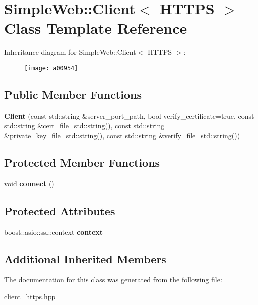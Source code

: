 \hypertarget{a00954}{}\section{Simple\+Web\+:\+:Client$<$ H\+T\+T\+PS $>$ Class Template Reference}
\label{a00954}
Inheritance diagram for Simple\+Web\+:\+:Client$<$ H\+T\+T\+PS $>$\+:\begin{figure}[H]
\begin{center}
\leavevmode
\texttt{[image: a00954]}
\end{center}
\end{figure}
\subsection*{Public Member Functions}
\begin{DoxyCompactItemize}
\item 
\mbox{\label{a00954_abd87d3dc08c9fed3a60f18c749b8bacd}} 
{\bfseries Client} (const std\+::string \&server\+\_\+port\+\_\+path, bool verify\+\_\+certificate=true, const std\+::string \&cert\+\_\+file=std\+::string(), const std\+::string \&private\+\_\+key\+\_\+file=std\+::string(), const std\+::string \&verify\+\_\+file=std\+::string())
\end{DoxyCompactItemize}
\subsection*{Protected Member Functions}
\begin{DoxyCompactItemize}
\item 
\mbox{\label{a00954_a833f6fd136e3158b873bee024d6e188c}} 
void {\bfseries connect} ()
\end{DoxyCompactItemize}
\subsection*{Protected Attributes}
\begin{DoxyCompactItemize}
\item 
\mbox{\label{a00954_afe57679cc6153d5d1fe8abc94a8fa58a}} 
boost\+::asio\+::ssl\+::context {\bfseries context}
\end{DoxyCompactItemize}
\subsection*{Additional Inherited Members}


The documentation for this class was generated from the following file\+:\begin{DoxyCompactItemize}
\item 
client\+\_\+https.\+hpp\end{DoxyCompactItemize}
